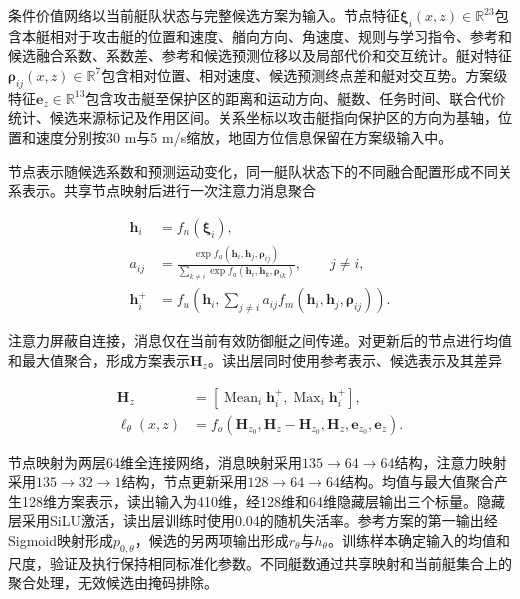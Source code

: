 \documentclass[UTF8,a4paper,zihao=5,fontset=none]{ctexart}
\begin{document}
条件价值网络以当前艇队状态与完整候选方案为输入。节点特征\(\boldsymbol\xi_i(x,z)\in\mathbb R^{23}\)包含本艇相对于攻击艇的位置和速度、艏向方向、角速度、规则与学习指令、参考和候选融合系数、系数差、参考和候选预测位移以及局部代价和交互统计。艇对特征\(\boldsymbol\rho_{ij}(x,z)\in\mathbb R^7\)包含相对位置、相对速度、候选预测终点差和艇对交互势。方案级特征\(\boldsymbol e_z\in\mathbb R^{13}\)包含攻击艇至保护区的距离和运动方向、艇数、任务时间、联合代价统计、候选来源标记及作用区间。关系坐标以攻击艇指向保护区的方向为基轴，位置和速度分别按30
m与5 m/s缩放，地固方位信息保留在方案级输入中。

节点表示随候选系数和预测运动变化，同一艇队状态下的不同融合配置形成不同关系表示。共享节点映射后进行一次注意力消息聚合

\[
\begin{aligned}
\boldsymbol h_i&=f_n(\boldsymbol\xi_i),\\
a_{ij}&=\frac{\exp f_a(\boldsymbol h_i,\boldsymbol h_j,\boldsymbol\rho_{ij})}
{\sum_{k\ne i}\exp f_a(\boldsymbol h_i,\boldsymbol h_k,\boldsymbol\rho_{ik})},
\qquad j\ne i,\\
\boldsymbol h_i^+&=f_u\!\left(\boldsymbol h_i,
\sum_{j\ne i}a_{ij}f_m(\boldsymbol h_i,\boldsymbol h_j,\boldsymbol\rho_{ij})\right).
\end{aligned}
\tag{27}
\]

注意力屏蔽自连接，消息仅在当前有效防御艇之间传递。对更新后的节点进行均值和最大值聚合，形成方案表示\(\boldsymbol H_z\)。读出层同时使用参考表示、候选表示及其差异

\[
\begin{aligned}
\boldsymbol H_z&=\left[\operatorname{Mean}_i\boldsymbol h_i^+,
\operatorname{Max}_i\boldsymbol h_i^+\right],\\
\boldsymbol\ell_\theta(x,z)
&=f_o\!\left(\boldsymbol H_{z_0},\boldsymbol H_z-\boldsymbol H_{z_0},
\boldsymbol H_z,\boldsymbol e_{z_0},\boldsymbol e_z\right).
\end{aligned}
\tag{28}
\]

节点映射为两层64维全连接网络，消息映射采用\(135\!\rightarrow\!64\!\rightarrow\!64\)结构，注意力映射采用\(135\!\rightarrow\!32\!\rightarrow\!1\)结构，节点更新采用\(128\!\rightarrow\!64\!\rightarrow\!64\)结构。均值与最大值聚合产生128维方案表示，读出输入为410维，经128维和64维隐藏层输出三个标量。隐藏层采用SiLU激活，读出层训练时使用0.04的随机失活率。参考方案的第一输出经Sigmoid映射形成\(p_{0,\theta}\)，候选的另两项输出形成\(r_\theta\)与\(h_\theta\)。训练样本确定输入的均值和尺度，验证及执行保持相同标准化参数。不同艇数通过共享映射和当前艇集合上的聚合处理，无效候选由掩码排除。
\end{document}
